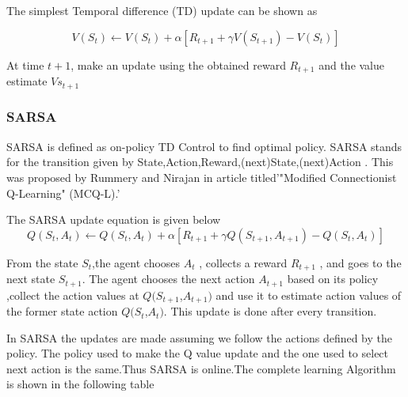 \documentclass[a4paper,12pt]{Classes/RoboticsLaTeX}
\begin{document}
     The simplest Temporal difference (TD) update can be shown as 

     \begin{equation}
    V(S_t) \leftarrow V(S_t) + \alpha \left[ R_{t+1} + \gamma V(S_{t+1}) - V(S_t) \right]
    \end{equation}

    At time \( t+1 \), make an update using the obtained reward ${R_{t+1}}$ and the value estimate ${V{s_{t+1}}}$

    \subsubsection{SARSA}
    SARSA is defined as on-policy TD Control to find optimal policy. SARSA stands for the transition given by State,Action,Reward,(next)State,(next)Action . This was proposed by Rummery and Nirajan  in article titled'"Modified Connectionist Q-Learning" (MCQ-L).'\cite{Rummery1994OnlineQU}

    The SARSA update equation is given below
    \begin{equation}
    Q(S_t, A_t) \leftarrow Q(S_t, A_t) + \alpha \left[ R_{t+1} + \gamma Q(S_{t+1}, A_{t+1}) - Q(S_t, A_t) \right]
    \end{equation}

     \noindent From the  state ${S_t}$,the agent chooses  ${A_t}$  , collects a reward ${R_{t+1}}$ , and goes to the next state ${S_{t+1}}$. The agent chooses the next action ${A_{t+1}}$ based on its policy ,collect the  action values at $Q({S_{t+1}}$,${A_{t+1}})$ and use it to estimate action values of the former state action $Q({S_t}$,${A_t})$.
     This update is done after every transition. 
     
     In SARSA the updates are made assuming we follow the actions defined by the policy. The policy used to make the Q value update and the one used to select next action is the same.Thus SARSA is online.The complete learning Algorithm is shown in the following table \cite{Sutton_Barto_2020}
\end{document}
